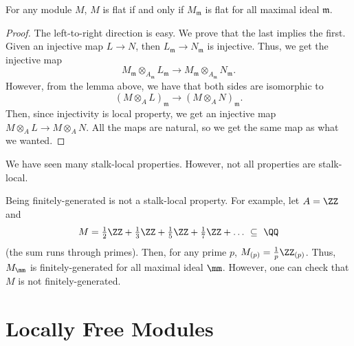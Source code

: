 \begin{proposition}
    \label{prop:local_flat}
    For any module $M$, $M$ is flat if and only if $M_{\mathfrak m}$ is flat for all maximal ideal
    $\mathfrak m$.
\end{proposition}
\begin{proof}
    The left-to-right direction is easy.
    We prove that the last implies the first.
    Given an injective map $L\to N$,
    then $L_{\mathfrak m}\to N_{\mathfrak m}$
    is injective. Thus, we get the injective map
    $$M_{\mathfrak m}\otimes_{A_{\mathfrak m}}
    L_{\mathfrak m} \to M_{\mathfrak m}\otimes_{A_{\mathfrak m}}
    N_{\mathfrak m}.$$
    However, from the lemma above, we have that
    both sides are isomorphic to
    $$(M\otimes_A L)_{\mathfrak m} \to 
    (M\otimes_A N)_{\mathfrak m}.$$
    Then, since injectivity is local property,
    we get an injective map $M\otimes_A L\to M\otimes_A N$.
    All the maps are natural, so we get the same
    map as what we wanted.
\end{proof}
We have seen many stalk-local properties.
However, not all properties are stalk-local.
\begin{example}
    Being finitely-generated is not a stalk-local property.
    For example, let $A=\ZZ$ and 
    $$M = \tfrac 12 \ZZ + \tfrac 13 \ZZ + \tfrac 15 \ZZ 
    + \tfrac 17\ZZ + \dots\ \subseteq\ \QQ$$
    (the sum runs through primes).
    Then, for any prime $p$, $M_{(p)} = \tfrac 1p \ZZ_{(p)}$.
    Thus, $M_\mm$ is finitely-generated for all 
    maximal ideal $\mm$.
    However, one can check that $M$ is not finitely-generated.
\end{example}
\section{Locally Free Modules}
\label{sec:locally_free}
